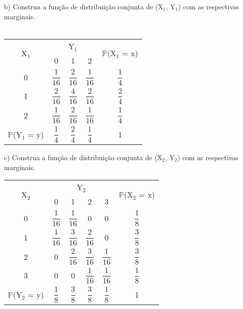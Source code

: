 \documentclass[12pt,a4paper,draft]{article}
\begin{document}
	\vspace{1cm}
	b) Construa a função de distribuição conjunta de (X$_{1}$, Y$_{1}$) com as respectivas marginais.\\
	\vspace{1cm}\\
	\begin{center}
		\begin{tabular}{ccccc}\midrule
			\multirow{2}{*}{X$_{1}$} & \multicolumn{3}{c}{Y$_{1}$} & \multirow{2}{*}{$\mathbb{P}$(X$_{1}$ = x)}\\ \cmidrule{2-4}
			& 0 & 1 & 2 & \\ \midrule
			0 & $\dfrac{1}{16}$ & $\dfrac{2}{16}$ & $\dfrac{1}{16}$ & $\dfrac{1}{4}$\\ \midrule
			1 & $\dfrac{2}{16}$ & $\dfrac{4}{16}$ & $\dfrac{2}{16}$ & $\dfrac{2}{4}$\\ \midrule
			2 & $\dfrac{1}{16}$ & $\dfrac{2}{16}$ & $\dfrac{1}{16}$ & $\dfrac{1}{4}$\\ \midrule
			$\mathbb{P}$(Y$_{1}$ = y) & $\dfrac{1}{4}$ & $\dfrac{2}{4}$ & $\dfrac{1}{4}$ & 1\\ \midrule
		\end{tabular}
	\end{center}
	\vspace{1cm}
	c) Construa a função de distribuição conjunta de (X$_{2}$, Y$_{2}$) com as respectivas marginais.
	\vspace{1cm}\\
	\begin{center}
		\begin{tabular}{cccccc}\midrule
			\multirow{2}{*}{X$_{2}$} & \multicolumn{4}{c}{Y$_{2}$} & \multirow{2}{*}{$\mathbb{P}$(X$_{2}$ = x)}\\ \cmidrule{2-5}
			& 0 & 1 & 2 & 3 & \\ \midrule
			0 & $\dfrac{1}{16}$ & $\dfrac{1}{16}$ & 0 & 0 & $\dfrac{1}{8}$\\ \midrule
			1 & $\dfrac{1}{16}$ & $\dfrac{3}{16}$ & $\dfrac{2}{16}$ & 0 & $\dfrac{3}{8}$\\ \midrule
			2 & 0 & $\dfrac{2}{16}$ & $\dfrac{3}{16}$ & $\dfrac{1}{16}$ & $\dfrac{3}{8}$\\ \midrule
			3 & 0 & 0 & $\dfrac{1}{16}$ & $\dfrac{1}{16}$ & $\dfrac{1}{8}$\\ \midrule
			$\mathbb{P}$(Y$_{2}$ = y) & $\dfrac{1}{8}$ & $\dfrac{3}{8}$ & $\dfrac{3}{8}$ & $\dfrac{1}{8}$ & 1\\ \midrule
		\end{tabular}
	\end{center}
\end{document}
